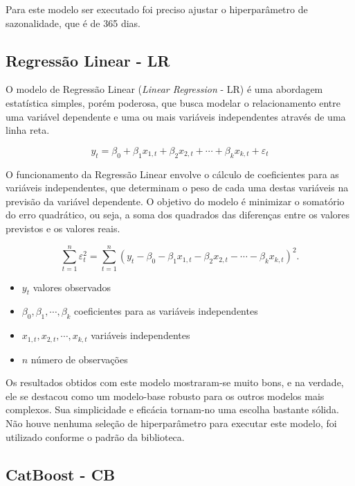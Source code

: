 Para este modelo ser executado foi preciso ajustar o hiperparâmetro de sazonalidade, que é de 365 dias.

\subsection{Regressão Linear - LR}

O modelo de Regressão Linear (\textit{Linear Regression} - LR) é uma abordagem estatística simples, porém poderosa, que busca modelar o relacionamento entre uma variável dependente e uma ou mais variáveis independentes através de uma linha reta.

\begin{equation}
	y_{t} = \beta_{0} + \beta_{1} x_{1,t} + \beta_{2} x_{2,t} + \cdots +
	\beta_{k} x_{k,t} + \varepsilon_{t}
\end{equation}

O funcionamento da Regressão Linear envolve o cálculo de coeficientes para as variáveis independentes, que determinam o peso de cada uma destas variáveis na previsão da variável dependente. O objetivo do modelo é minimizar o somatório do erro quadrático, ou seja, a soma dos quadrados das diferenças entre os valores previstos e os valores reais.\cite{hyndman_fpp3_2024c}

\begin{equation}
	\sum_{t=1}^n \varepsilon_t^2 = \sum_{t=1}^n (y_t -
	\beta_{0} - \beta_{1} x_{1,t} - \beta_{2} x_{2,t} - \cdots - \beta_{k} x_{k,t})^2.
\end{equation}
\begin{itemize}
	\item $y_t$ valores observados
	\item $\beta_{0} , \beta_{1} , \cdots , \beta_{k}$ coeficientes para as variáveis independentes
	\item $x_{1,t} , x_{2,t} , \cdots , x_{k,t}$ variáveis independentes
	\item $n$ número de observações
\end{itemize}

Os resultados obtidos com este modelo mostraram-se muito bons, e na verdade, ele se destacou como um modelo-base robusto para os outros modelos mais complexos. Sua simplicidade e eficácia tornam-no uma escolha bastante sólida. Não houve nenhuma seleção de hiperparâmetro para executar este modelo, foi utilizado conforme o padrão da biblioteca.

\subsection{CatBoost - CB}

